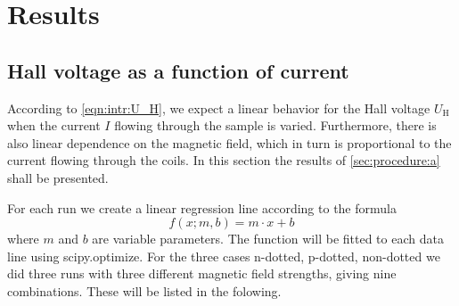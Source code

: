 \section{Results}
\label{sec:results}

\subsection{Hall voltage as a function of current}
\label{sec:res-a}
According to \autoref{eqn:intr:U_H}, we expect a linear behavior for the Hall voltage $U_\text{H}$ 
when the current $I$ flowing through the sample is varied. Furthermore, there is also linear
dependence on the magnetic field, which in turn is proportional to the current flowing through the
coils. In this section the results of \autoref{sec:procedure:a} shall be presented.

For each run we create a linear regression line according to the formula
\begin{equation}
  f(x; m, b) = m\cdot x + b
\end{equation}
where $m$ and $b$ are variable parameters. The function will be fitted to each data line using
scipy.optimize. For the three cases n-dotted, p-dotted, non-dotted we did three runs with three
different magnetic field strengths, giving nine combinations. These will be listed in the folowing.

